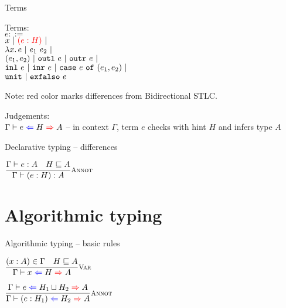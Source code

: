\documentclass{beamer}
\begin{document}
\begin{frame}{Terms}

Terms: \\
$e ::=$ \\
\qquad $x \pipe \termdiff{\annot{e}{H}} \pipe $ \\
\qquad $\fun{x}{e} \pipe \app{e_1}{e_2} \pipe$ \\
\qquad $\pair{e_1}{e_2} \pipe \outl{e} \pipe \outr{e} \pipe$ \\
\qquad $\inl{e} \pipe \inr{e} \pipe \case{e}{e_1}{e_2} \pipe$ \\
\qquad $\unit \pipe \exfalso{e}$

\vspace{2em}

Note: red color marks differences from Bidirectional STLC.

\vspace{2em}

Judgements: \\
$\fullhinting{\Gamma}{e}{H}{A}$ -- in context $\Gamma$, term $e$ checks with hint $H$ and infers type $A$

\end{frame}

\begin{frame}{Declarative typing -- differences}

\begin{center}
  $\infrule[Annot]{\typing{e}{A} \quad \sidecond{\hintorder{H}{A}}}{\typing{\annot{e}{H}}{A}}$
\end{center}

\end{frame}

\section{Algorithmic typing}

\begin{frame}{Algorithmic typing -- basic rules}

\begin{center}
  $\infrule[Var]{\sidecond{(x : A) \in \Gamma} \quad \sidecond{\hintorder{H}{A}}}{\hinting{x}{H}{A}}$

  \vspace{2em}

  $\infrule[Annot]{\hinting{e}{\hintlub{H_1}{H_2}}{A}}{\hinting{\annot{e}{H_1}}{H_2}{A}}$
\end{center}

\end{frame}
\end{document}
